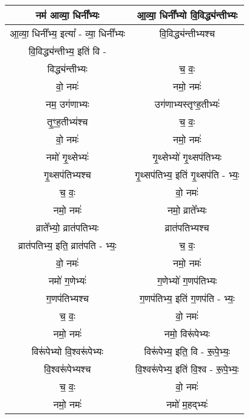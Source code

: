 \subsection{}
{\centering
\begin{longtable}{|c|c|}
\hline
नम॑ आव्या॒ धिनी᳚भ्यः               & आ॒व्या॒ धिनी᳚भ्यो वि॒विद्ध्य॑न्तीभ्यः\\
\hline
आ॒व्या॒ धिनी᳚भ्य॒ इत्या᳚ - व्या॒ धिनी᳚भ्यः   & वि॒विद्ध्य॑न्तीभ्यश्च\\
\hline
वि॒विद्ध्य॑न्तीभ्य॒ इति॑ वि -\\
विद्ध्य॑न्तीभ्यः                   & च॒ वः॒\\
\hline
वो॒ नमः॑                        & नमो॒ नमः॑\\
\hline
नम॒ उग॑णाभ्यः                    & उग॑णाभ्यस्तृꣳह॒तीभ्यः॑\\
\hline
तृ॒ꣳ॒ह॒तीभ्य॑श्च                     & च॒ वः॒\\
\hline
वो॒ नमः॑                        & नमो॒ नमः॑\\
\hline
नमो॑ गृ॒थ्सेभ्यः॑                    & गृ॒थ्सेभ्यो॑ गृ॒थ्सप॑तिभ्यः\\
\hline
गृ॒थ्सप॑तिभ्यश्च                    & गृ॒थ्सप॑तिभ्य॒ इति॑ गृ॒थ्सप॑ति - भ्यः॒\\
\hline
च॒ वः॒                          & वो॒ नमः॑\\
\hline
नमो॒ नमः॑                       & नमो॒ व्राते᳚भ्यः\\
\hline
व्राते᳚भ्यो॒ व्रात॑पतिभ्यः            & व्रात॑पतिभ्यश्च\\
\hline
व्रात॑पतिभ्य॒ इति॒ व्रात॑पति - भ्यः॒   & च॒ वः॒\\
\hline
वो॒ नमः॑                        & नमो॒ नमः॑\\
\hline
नमो॑ ग॒णेभ्यः॑                     & ग॒णेभ्यो॑ ग॒णप॑तिभ्यः\\
\hline
ग॒णप॑तिभ्यश्च                     & ग॒णप॑तिभ्य॒ इति॑ ग॒णप॑ति - भ्यः॒\\
\hline
च॒ वः॒                          & वो॒ नमः॑\\
\hline
नमो॒ नमः॑                       & नमो॒ विरू॑पेभ्यः\\
\hline
विरू॑पेभ्यो वि॒श्वरू॑पेभ्यः             & विरू॑पेभ्य॒ इति॒ वि - रू॒पे॒भ्यः॒\\
\hline
वि॒श्वरू॑पेभ्यश्च                    & वि॒श्वरू॑पेभ्य॒ इति॑ वि॒श्व - रू॒पे॒भ्यः॒\\
\hline
च॒ वः॒                          & वो॒ नमः॑\\
\hline
नमो॒ नमः॑                       & नमो॑ म॒हद्भ्यः॑\\

\end{longtable}}
